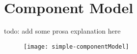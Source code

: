 \section{Component Model}

todo: add some prosa explanation here

\begin{figure}[hbt!]
    \texttt{[image: simple-componentModel]}
\end{figure}
